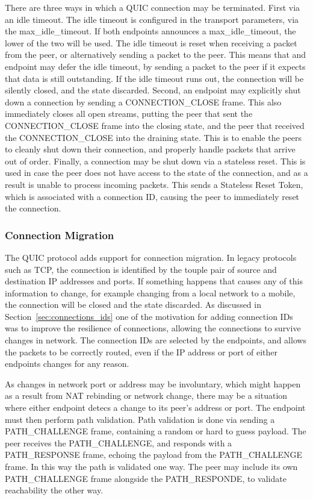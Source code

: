 \documentclass[english, 12pt, a4paper, elec, utf8, a-2b, online]{aaltothesis}
\begin{document}
There are three ways in which a QUIC connection may be terminated. First via an
idle timeout. The idle timeout is configured in the transport parameters, via the
max\_idle\_timeout. If both endpoints announces a max\_idle\_timeout, the lower of
the two will be used. The idle timeout is reset when receiving a packet from the 
peer, or alternatively sending a packet to the peer. This means that and endpoint
may defer the idle timeout, by sending a packet to the peer if it expects that
data is still outstanding. If the idle timeout runs out, the connection will be
silently closed, and the state discarded. Second, an endpoint may explicitly
shut down a connection by sending a CONNECTION\_CLOSE frame. This also immediately
closes all open streams, putting the peer that sent the CONNECTION\_CLOSE frame into
the closing state, and the peer that received the CONNECTION\_CLOSE into the draining
state. This is to enable the peers to cleanly shut down their connection, and
properly handle packets that arrive out of order. Finally, a connection may be
shut down via a stateless reset. This is used in case the peer does not have
access to the state of the connection, and as a result is unable to process incoming
packets. This sends a Stateless Reset Token, which is associated with a connection ID,
causing the peer to immediately reset the connection.

\subsubsection{Connection Migration}

The QUIC protocol adds support for connection migration. In legacy protocols such
as TCP, the connection is identified by the touple pair of source and destination
IP addresses and ports. If something happens that causes any of this information to
change, for example changing from a local network to a mobile, the connection will
be closed and the state discarded. As discussed in Section~\ref{sec:connections_ids}
one of the motivation for adding connection IDs was to improve the resilience of
connections, allowing the connections to survive changes in network. The connection IDs
are selected by the endpoints, and allows the packets to be correctly routed,
even if the IP address or port of either endpoints changes for any reason\cite{rfc9000}.

As changes in network port or address may be involuntary, which might happen as a
result from NAT rebinding or network change, there may be a situation where
either endpoint detecs a change to its peer's address or port. The endpoint must then perform
path validation. Path validation is done via sending a PATH\_CHALLENGE frame, containing
a random or hard to guess payload. The peer receives the PATH\_CHALLENGE, and responds
with a PATH\_RESPONSE frame, echoing the payload from the PATH\_CHALLENGE frame.
In this way the path is validated one way. The peer may include its own PATH\_CHALLENGE
frame alongside the PATH\_RESPONDE, to validate reachability the other way\cite{rfc9000}.
\end{document}
